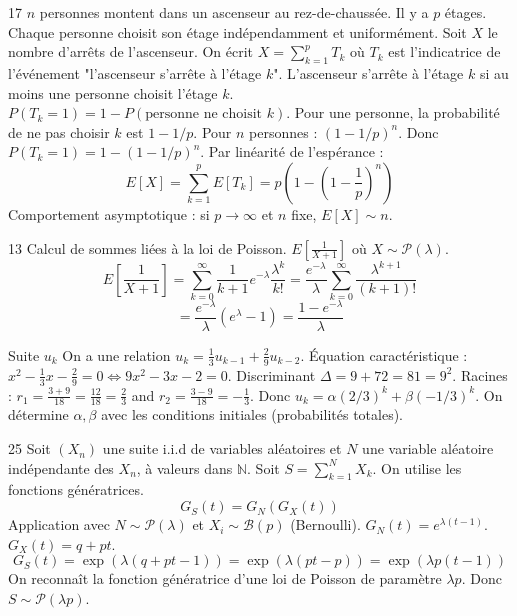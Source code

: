 \begin{correction}{17}
$n$ personnes montent dans un ascenseur au rez-de-chaussée. Il y a $p$ étages.
Chaque personne choisit son étage indépendamment et uniformément.
Soit $X$ le nombre d'arrêts de l'ascenseur.
On écrit $X = \sum_{k=1}^p T_k$ où $T_k$ est l'indicatrice de l'événement "l'ascenseur s'arrête à l'étage $k$".
L'ascenseur s'arrête à l'étage $k$ si au moins une personne choisit l'étage $k$.
$P(T_k = 1) = 1 - P(\text{personne ne choisit } k)$.
Pour une personne, la probabilité de ne pas choisir $k$ est $1 - 1/p$.
Pour $n$ personnes : $(1 - 1/p)^n$.
Donc $P(T_k = 1) = 1 - (1 - 1/p)^n$.
Par linéarité de l'espérance :
$$ E[X] = \sum_{k=1}^p E[T_k] = p \left( 1 - \left(1 - \frac{1}{p}\right)^n \right) $$
Comportement asymptotique : si $p \to \infty$ et $n$ fixe, $E[X] \sim n$.
\end{correction}

\begin{correction}{13}
Calcul de sommes liées à la loi de Poisson.
$E[\frac{1}{X+1}]$ où $X \sim \mathcal{P}(\lambda)$.
$$ E\left[\frac{1}{X+1}\right] = \sum_{k=0}^\infty \frac{1}{k+1} e^{-\lambda} \frac{\lambda^k}{k!} = \frac{e^{-\lambda}}{\lambda} \sum_{k=0}^\infty \frac{\lambda^{k+1}}{(k+1)!} $$
$$ = \frac{e^{-\lambda}}{\lambda} (e^\lambda - 1) = \frac{1 - e^{-\lambda}}{\lambda} $$
\end{correction}

\begin{correction}{Suite $u_k$}
On a une relation $u_k = \frac{1}{3} u_{k-1} + \frac{2}{9} u_{k-2}$.
Équation caractéristique : $x^2 - \frac{1}{3}x - \frac{2}{9} = 0 \iff 9x^2 - 3x - 2 = 0$.
Discriminant $\Delta = 9 + 72 = 81 = 9^2$.
Racines : $r_1 = \frac{3+9}{18} = \frac{12}{18} = \frac{2}{3}$ and $r_2 = \frac{3-9}{18} = -\frac{1}{3}$.
Donc $u_k = \alpha (2/3)^k + \beta (-1/3)^k$.
On détermine $\alpha, \beta$ avec les conditions initiales (probabilités totales).
\end{correction}

\begin{correction}{25}
Soit $(X_n)$ une suite i.i.d de variables aléatoires et $N$ une variable aléatoire indépendante des $X_n$, à valeurs dans $\mathbb{N}$.
Soit $S = \sum_{k=1}^N X_k$.
On utilise les fonctions génératrices.
$$ G_S(t) = G_N(G_X(t)) $$
Application avec $N \sim \mathcal{P}(\lambda)$ et $X_i \sim \mathcal{B}(p)$ (Bernoulli).
$G_N(t) = e^{\lambda(t-1)}$. $G_X(t) = q + pt$.
$$ G_S(t) = \exp(\lambda(q+pt-1)) = \exp(\lambda(pt - p)) = \exp(\lambda p (t-1)) $$
On reconnaît la fonction génératrice d'une loi de Poisson de paramètre $\lambda p$.
Donc $S \sim \mathcal{P}(\lambda p)$.
\end{correction}

